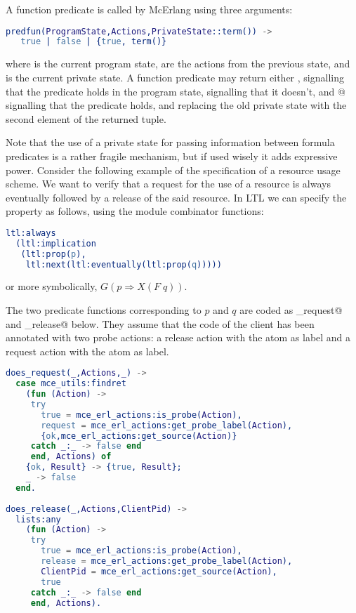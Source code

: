 \documentclass[a4paper]{article}
\begin{document}
A function predicate is called by McErlang using three arguments:
\begin{lstlisting}[language=Erlang]
predfun(ProgramState,Actions,PrivateState::term()) -> 
   true | false | {true, term()}
\end{lstlisting}
where \lstinline@ProgramState@ is the current program state,
\lstinline@Actions@ are the actions from the previous state,
and \lstinline@PrivateState@ is the current private state.
A function predicate may return either \lstinline@true@, signalling
that the predicate holds in the program state,
\lstinline@false@ signalling that it doesn't, and
@ signalling that the predicate
holds, and replacing the old private state with the second element 
of the returned tuple. 

Note that the use of a private state
for passing information between formula predicates is a rather
fragile mechanism, but if used wisely it adds expressive power.
Consider the following example of the specification
of a resource usage scheme. We want to verify that a request
for the use of a resource is always eventually followed by a release
of the said resource. In LTL we can specify the property
as follows, using the \lstinline@ltl@ module combinator functions:
\begin{lstlisting}[language=Erlang]
ltl:always
  (ltl:implication
   (ltl:prop(p),
    ltl:next(ltl:eventually(ltl:prop(q)))))
\end{lstlisting}
or more symbolically, 
\(
\mathit{G}(\mathit{p} \Rightarrow \mathit{X}(\mathit{F}\; \mathit{q}))
\).

The two predicate functions corresponding to $\mathit{p}$
and $\mathit{q}$ are coded as \lstinline@does_request@
and \lstinline@does_release@ below. They assume that the
code of the client has been annotated with two probe actions: a release 
action with the atom \lstinline@release@ as label and
a request action with the atom \lstinline@request@ as label.

\begin{lstlisting}[language=Erlang]
does_request(_,Actions,_) ->
  case mce_utils:findret
    (fun (Action) -> 
	 try
	   true = mce_erl_actions:is_probe(Action),
	   request = mce_erl_actions:get_probe_label(Action),
	   {ok,mce_erl_actions:get_source(Action)}
	 catch _:_ -> false end
     end, Actions) of
    {ok, Result} -> {true, Result};
    _ -> false
  end.
      
does_release(_,Actions,ClientPid) ->
  lists:any
    (fun (Action) ->
	 try
	   true = mce_erl_actions:is_probe(Action),
	   release = mce_erl_actions:get_probe_label(Action),
	   ClientPid = mce_erl_actions:get_source(Action),
	   true
	 catch _:_ -> false end
     end, Actions).
\end{lstlisting}
\end{document}
